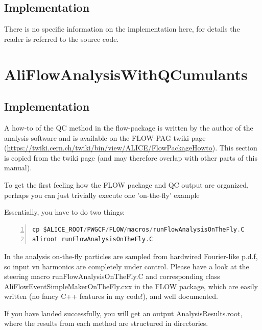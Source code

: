 \documentclass[a4paper]{book}
\numberwithin{equation}{subsection}
\begin{document}
\subsection{Implementation}
There is no specific information on the implementation here, for details the reader is referred to the source code.

\section{AliFlowAnalysisWithQCumulants}\label{sec:QC}
\subsection{Implementation}
A how-to of the QC method in the flow-package is written by the author of the analysis software and is available on the FLOW-PAG twiki page (\href{https://twiki.cern.ch/twiki/bin/view/ALICE/FlowPackageHowto}{https://twiki.cern.ch/twiki/bin/view/ALICE/FlowPackageHowto}). This section is copied from the twiki page (and may therefore overlap with other parts of this manual).

 To get the first feeling how the FLOW package and QC output are organized, perhaps you can just trivially execute one 'on-the-fly' example 

 Essentially, you have to do two things: 
	\begin{lstlisting}[language=C, numbers=left]
cp $ALICE_ROOT/PWGCF/FLOW/macros/runFlowAnalysisOnTheFly.C
aliroot runFlowAnalysisOnTheFly.C \end{lstlisting}

 In the analysis on-the-fly particles are sampled from hardwired Fourier-like p.d.f, so input vn harmonics are completely under control. Please have a look at the steering macro runFlowAnalysisOnTheFly.C and corresponding class AliFlowEventSimpleMakerOnTheFly.cxx in the FLOW package, which are easily written (no fancy C++ features in my code!), and well documented. 

 If you have landed successfully, you will get an output AnalysisResults.root, where the results from each method are structured in directories. 
\end{document}
